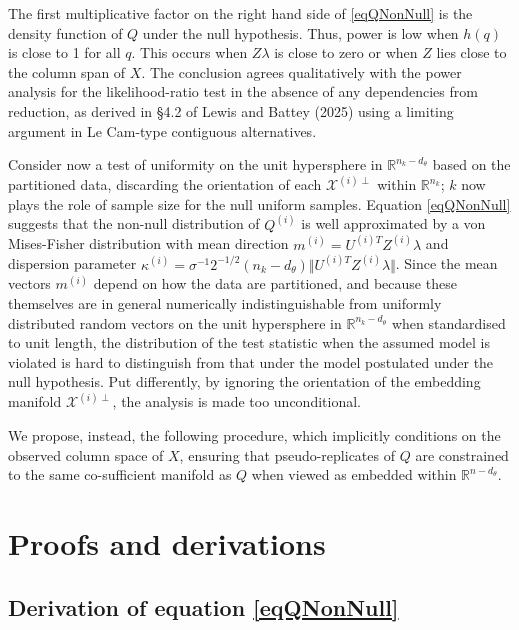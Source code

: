\documentclass[10pt, reqno]{amsart}
\numberwithin{equation}{section}
\newcommand{\RR}{\mathbb{R}}
\begin{document}
\begin{appendix}
The first multiplicative factor on the right hand side of \eqref{eqQNonNull} is the density function of $Q$ under the null hypothesis. Thus, power is low when $h(q)$ is close to 1 for all $q$.  This occurs when $Z\lambda$ is close to zero or when $Z$ lies close to the column span of $X$. The conclusion agrees qualitatively with the power analysis for the likelihood-ratio test in the absence of any dependencies from reduction, as derived in \S 4.2 of Lewis and Battey (2025) using a limiting argument in Le Cam-type contiguous alternatives. 

Consider now a test of uniformity on the unit hypersphere in $\RR^{n_{k}-d_\theta}$ based on the partitioned data, discarding the orientation of each $\mathcal{X}^{(i)\perp}$ within $\RR^{n_k}$; $k$ now plays the role of sample size for the null uniform samples. Equation \eqref{eqQNonNull} suggests that the non-null distribution of $Q^{(i)}$ is well approximated by a von Mises-Fisher distribution with mean direction $m^{(i)} = U^{(i)T}Z^{(i)}\lambda$ and dispersion parameter $\kappa^{(i)} = \sigma^{-1} 2^{-1/2} (n_k - d_\theta) \Vert U^{(i)T}Z^{(i)}\lambda \Vert$. Since the mean vectors $m^{(i)}$ depend on how the data are partitioned, and because these themselves are in general numerically indistinguishable from uniformly distributed random vectors on the unit hypersphere in $\RR^{n_k-d_\theta}$ when standardised to unit length, the distribution of the test statistic when the assumed model is violated is hard to distinguish from that under the model postulated under the null hypothesis. Put differently, by ignoring the orientation of the embedding manifold $\mathcal{X}^{(i)\perp}$, the analysis is made too unconditional.

We propose, instead, the following procedure, which implicitly conditions on the observed column space of $X$, ensuring that pseudo-replicates of $Q$ are constrained to the same co-sufficient manifold as $Q$ when viewed as embedded within $\RR^{n-d_\theta}$.



\section{Proofs and derivations}\label{appDerivations}

\subsection{Derivation of equation \eqref{eqQNonNull}}\label{appQNonNull}


\end{appendix}
\end{document}
